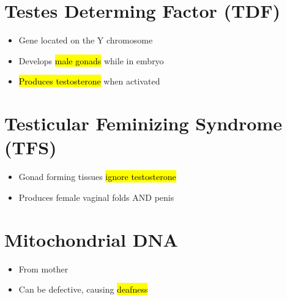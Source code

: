 \documentclass[a4paper,12pt]{article}
\begin{document}
\section{Testes Determing Factor (TDF)}
\begin{itemize}
    \item{Gene located on the Y chromosome}
    \item{Develops \hl{male gonads} while in embryo}
    \item{\hl{Produces testosterone} when activated}
\end{itemize}

\section{Testicular Feminizing Syndrome (TFS)}
\begin{itemize}
    \item{Gonad forming tissues \hl{ignore testosterone}}
    \item{Produces female vaginal folds AND penis}
\end{itemize}

\section{Mitochondrial DNA}
\begin{itemize}
    \item{From mother}
    \item{Can be defective, causing \hl{deafness}}
\end{itemize}
\end{document}
